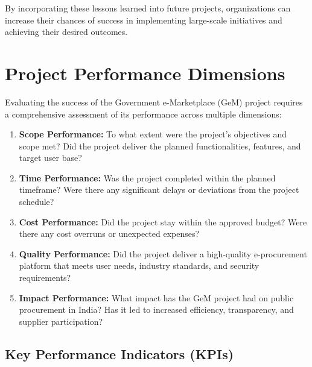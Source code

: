 By incorporating these lessons learned into future projects, organizations can increase their chances of success in implementing large-scale initiatives and achieving their desired outcomes.


\section{Project Performance Dimensions}

Evaluating the success of the Government e-Marketplace (GeM) project requires a comprehensive assessment of its performance across multiple dimensions:

\begin{enumerate}
    \item \textbf{Scope Performance:} To what extent were the project's objectives and scope met? Did the project deliver the planned functionalities, features, and target user base?
    
    \item \textbf{Time Performance:} Was the project completed within the planned timeframe? Were there any significant delays or deviations from the project schedule?
    
    \item \textbf{Cost Performance:} Did the project stay within the approved budget? Were there any cost overruns or unexpected expenses?
    
    \item \textbf{Quality Performance:} Did the project deliver a high-quality e-procurement platform that meets user needs, industry standards, and security requirements?
    
    \item \textbf{Impact Performance:} What impact has the GeM project had on public procurement in India? Has it led to increased efficiency, transparency, and supplier participation?
\end{enumerate}

\subsection{Key Performance Indicators (KPIs)}

